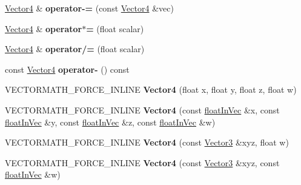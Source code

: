 \begin{DoxyCompactItemize}
\hyperlink{classVectormath_1_1Aos_1_1Vector4}{Vector4} \& {\bfseries operator-\/=} (const \hyperlink{classVectormath_1_1Aos_1_1Vector4}{Vector4} \&vec)
\item 
\mbox{\label{classVectormath_1_1Aos_1_1Vector4_ac7266ac9a7039e186458eebbaab9b2d9}} 
\hyperlink{classVectormath_1_1Aos_1_1Vector4}{Vector4} \& {\bfseries operator$\ast$=} (float scalar)
\item 
\mbox{\label{classVectormath_1_1Aos_1_1Vector4_a828cc75c1e71ecde819225ad1a8d5d7f}} 
\hyperlink{classVectormath_1_1Aos_1_1Vector4}{Vector4} \& {\bfseries operator/=} (float scalar)
\item 
\mbox{\label{classVectormath_1_1Aos_1_1Vector4_a71fbcef459b9a5871ac0e40c94d362fc}} 
const \hyperlink{classVectormath_1_1Aos_1_1Vector4}{Vector4} {\bfseries operator-\/} () const
\item 
\mbox{\label{classVectormath_1_1Aos_1_1Vector4_a3a4501d24f6f6c97af5ed98b457215e2}} 
V\+E\+C\+T\+O\+R\+M\+A\+T\+H\+\_\+\+F\+O\+R\+C\+E\+\_\+\+I\+N\+L\+I\+NE {\bfseries Vector4} (float x, float y, float z, float w)
\item 
\mbox{\label{classVectormath_1_1Aos_1_1Vector4_ac78e78499f3fb8b5dd65d33c82ecff30}} 
V\+E\+C\+T\+O\+R\+M\+A\+T\+H\+\_\+\+F\+O\+R\+C\+E\+\_\+\+I\+N\+L\+I\+NE {\bfseries Vector4} (const \hyperlink{classVectormath_1_1floatInVec}{float\+In\+Vec} \&x, const \hyperlink{classVectormath_1_1floatInVec}{float\+In\+Vec} \&y, const \hyperlink{classVectormath_1_1floatInVec}{float\+In\+Vec} \&z, const \hyperlink{classVectormath_1_1floatInVec}{float\+In\+Vec} \&w)
\item 
\mbox{\label{classVectormath_1_1Aos_1_1Vector4_aa01a20cca631ed841fa5e7dc054d3a3b}} 
V\+E\+C\+T\+O\+R\+M\+A\+T\+H\+\_\+\+F\+O\+R\+C\+E\+\_\+\+I\+N\+L\+I\+NE {\bfseries Vector4} (const \hyperlink{classVectormath_1_1Aos_1_1Vector3}{Vector3} \&xyz, float w)
\item 
\mbox{\label{classVectormath_1_1Aos_1_1Vector4_a63194e4609276a4b76f67a6c33668e4d}} 
V\+E\+C\+T\+O\+R\+M\+A\+T\+H\+\_\+\+F\+O\+R\+C\+E\+\_\+\+I\+N\+L\+I\+NE {\bfseries Vector4} (const \hyperlink{classVectormath_1_1Aos_1_1Vector3}{Vector3} \&xyz, const \hyperlink{classVectormath_1_1floatInVec}{float\+In\+Vec} \&w)

\end{DoxyCompactItemize}
